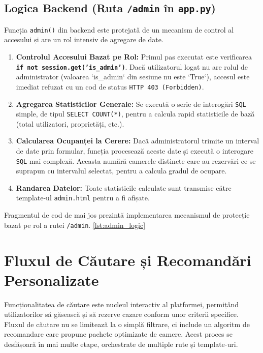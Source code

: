 \documentclass[12pt, a4paper, oneside, romanian]{teza-upb}
\begin{document}
\subsection{Logica Backend (Ruta \texttt{/admin} în \texttt{app.py})}
Funcția \texttt{admin()} din backend este protejată de un mecanism de control al accesului și are un rol intensiv de agregare de date.
\begin{enumerate}
	\item \textbf{Controlul Accesului Bazat pe Rol:} Primul pas executat este verificarea \textbf{\texttt{if not session.get('is\_admin')}}. Dacă utilizatorul logat nu are rolul de administrator (valoarea `is\_admin` din sesiune nu este `True`), accesul este imediat refuzat cu un cod de status \texttt{HTTP 403 (Forbidden)}.
	\item \textbf{Agregarea Statisticilor Generale:} Se execută o serie de interogări \texttt{SQL} simple, de tipul \texttt{SELECT COUNT(*)}, pentru a calcula rapid statisticile de bază (total utilizatori, proprietăți, etc.).
	\item \textbf{Calcularea Ocupanței la Cerere:} Dacă administratorul trimite un interval de date prin formular, funcția procesează aceste date și execută o interogare \texttt{SQL} mai complexă. Aceasta numără camerele distincte care au rezervări ce se suprapun cu intervalul selectat, pentru a calcula gradul de ocupare.
	\item \textbf{Randarea Datelor:} Toate statisticile calculate sunt transmise către template-ul \texttt{admin.html} pentru a fi afișate.
\end{enumerate}


Fragmentul de cod de mai jos prezintă implementarea mecanismul de protecție bazat pe rol a rutei \texttt{/admin}. \ref{lst:admin_logic}



\section{Fluxul de Căutare și Recomandări Personalizate}
Funcționalitatea de căutare este nucleul interactiv al platformei, permițând utilizatorilor să găsească și să rezerve cazare conform unor criterii specifice. Fluxul de căutare nu se limitează la o simplă filtrare, ci include un algoritm de recomandare care propune pachete optimizate de camere. Acest proces se desfășoară în mai multe etape, orchestrate de multiple rute și template-uri.
\end{document}
